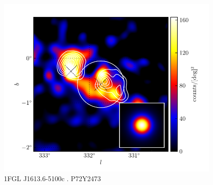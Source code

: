 \documentclass[12pt,preprint]{aastex}
\begin{document}
\begin{figure}
  \begin{center}
    \includegraphics[type=pdf,ext=.pdf,read=.pdf]{source_plots/source_1FGL_J1613.6-5100c}
  \end{center}
  \caption{
  1FGL J1613.6-5100c . P72Y2473
  }\label{1FGL_J1613.6-5100c}
\end{figure}
\end{document}
